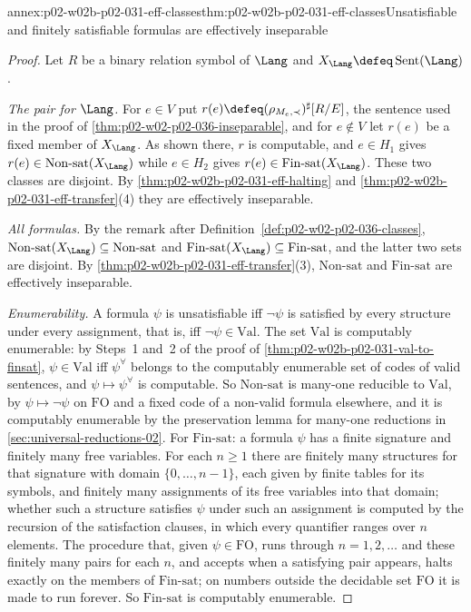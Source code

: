 \begin{annexitem}{annex:p02-w02b-p02-031-eff-classes}{thm:p02-w02b-p02-031-eff-classes}{Unsatisfiable and finitely satisfiable formulas are effectively inseparable}
\begin{proof}
Let \(R\) be a binary relation symbol of \(\Lang\) and
\(X_{\Lang}\defeq\operatorname{Sent}(\Lang)\).

\emph{The pair for \(\Lang\).}  For \(e\in V\) put
\(r(e)\defeq(\rho_{M_e,\prec})^{\sharp}[R/E]\), the sentence used in the proof
of \cref{thm:p02-w02-p02-036-inseparable}, and for \(e\notin V\) let \(r(e)\)
be a fixed member of \(X_{\Lang}\).  As shown there, \(r\) is computable, and
\(e\in H_1\) gives \(r(e)\in\mathrm{Non\text{-}sat}(X_{\Lang})\) while \(e\in
H_2\) gives \(r(e)\in\mathrm{Fin\text{-}sat}(X_{\Lang})\).  These two classes
are disjoint.  By \cref{thm:p02-w02b-p02-031-eff-halting} and
\cref{thm:p02-w02b-p02-031-eff-transfer}(4) they are effectively inseparable.

\emph{All formulas.}  By the remark after
Definition~\ref{def:p02-w02-p02-036-classes},
\(\mathrm{Non\text{-}sat}(X_{\Lang})\subseteq\mathrm{Non\text{-}sat}\) and
\(\mathrm{Fin\text{-}sat}(X_{\Lang})\subseteq\mathrm{Fin\text{-}sat}\), and
the latter two sets are disjoint.  By
\cref{thm:p02-w02b-p02-031-eff-transfer}(3), \(\mathrm{Non\text{-}sat}\) and
\(\mathrm{Fin\text{-}sat}\) are effectively inseparable.

\emph{Enumerability.}  A formula \(\psi\) is unsatisfiable iff \(\neg\psi\) is
satisfied by every structure under every assignment, that is, iff
\(\neg\psi\in\mathrm{Val}\).  The set \(\mathrm{Val}\) is computably
enumerable: by Steps~1 and~2 of the proof of
\cref{thm:p02-w02b-p02-031-val-to-finsat}, \(\psi\in\mathrm{Val}\) iff
\(\psi^{\forall}\) belongs to the computably enumerable set of codes of valid
sentences, and \(\psi\mapsto\psi^{\forall}\) is computable.  So
\(\mathrm{Non\text{-}sat}\) is many-one reducible to \(\mathrm{Val}\), by
\(\psi\mapsto\neg\psi\) on \(\mathrm{FO}\) and a fixed code of a non-valid
formula elsewhere, and it is computably enumerable by
the preservation lemma for many-one reductions in \cref{sec:universal-reductions-02}.  For \(\mathrm{Fin\text{-}sat}\): a
formula \(\psi\) has a finite signature and finitely many free variables.  For
each \(n\geq1\) there are finitely many structures for that signature with
domain \(\{0,\ldots,n-1\}\), each given by finite tables for its symbols, and
finitely many assignments of its free variables into that domain; whether such
a structure satisfies \(\psi\) under such an assignment is computed by the
recursion of the satisfaction clauses, in which every quantifier ranges over
\(n\) elements.  The procedure that, given \(\psi\in\mathrm{FO}\), runs through
\(n=1,2,\ldots\) and these finitely many pairs for each \(n\), and accepts when
a satisfying pair appears, halts exactly on the members of
\(\mathrm{Fin\text{-}sat}\); on numbers outside the decidable set
\(\mathrm{FO}\) it is made to run forever.  So \(\mathrm{Fin\text{-}sat}\) is
computably enumerable.


\end{proof}
\end{annexitem}
